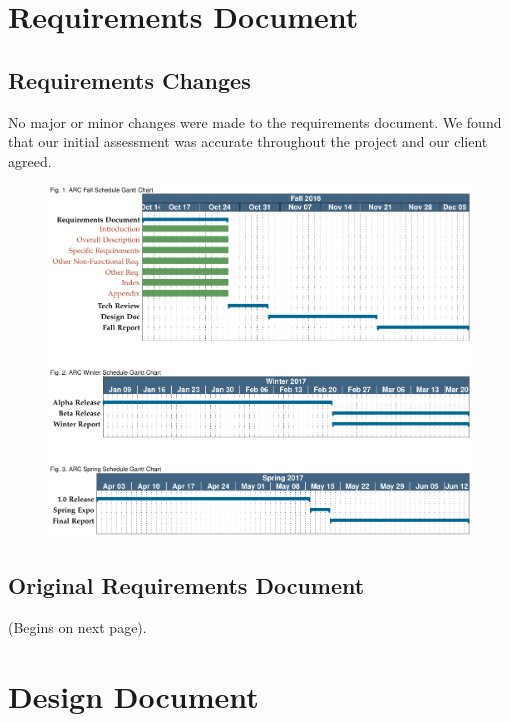 \documentclass[compsoc,draftclsnofoot,onecolumn,10pt]{IEEEtran}
\begin{document}
\clearpage
\section{Requirements Document}

\subsection{Requirements Changes}
No major or minor changes were made to the requirements document. We found that our initial assessment was accurate throughout the project and our client agreed.
\begin{figure}[h!]
\includegraphics[scale=.5]{gantt}
\end{figure}

\subsection{Original Requirements Document}
(Begins on next page).

% 


\clearpage
\section{Design Document}
\end{document}
